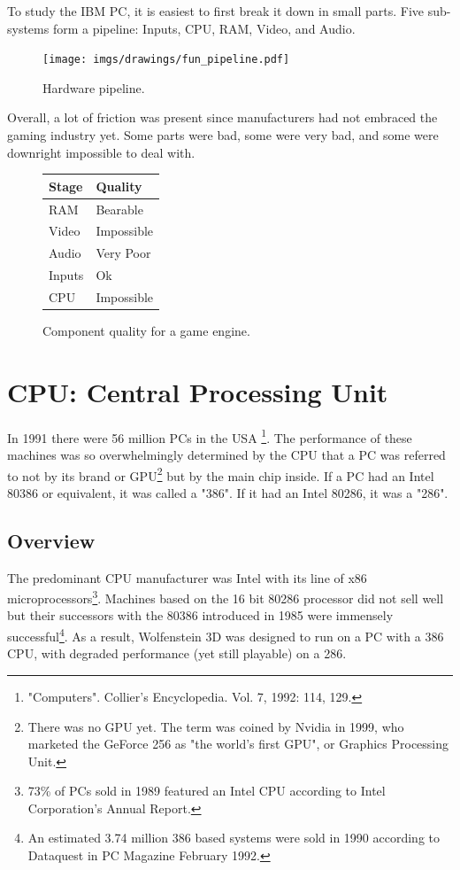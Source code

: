 \documentclass[book.tex]{subfiles}
\begin{document}
\label{chapter_hardware}
To study the IBM PC, it is easiest to first break it down in small parts. Five sub-systems form a pipeline: Inputs, CPU, RAM, Video, and Audio.\\
\begin{figure}[H]
\centering
\texttt{[image: imgs/drawings/fun\_pipeline.pdf]}
\caption{Hardware pipeline.}
\label{fig:digraph}
\end{figure}

Overall, a lot of friction was present since manufacturers had not embraced the gaming industry yet. Some parts were bad, some were very bad, and some were downright impossible to deal with.\\
\par

\begin{figure}[H]
\centering
\begin{tabularx}{\textwidth}{ X X  }
  \toprule
  \textbf{Stage} & \textbf{Quality} \\ \bottomrule
  RAM & Bearable \\ 
  Video & Impossible \\ 
  Audio & Very Poor \\ 
  Inputs & Ok \\ 
  CPU & Impossible \\ \bottomrule
\end{tabularx}
\caption{Component quality for a game engine.}
\end{figure}



\section{CPU: Central Processing Unit}
  
  In 1991 there were 56 million PCs in the USA \footnote{"Computers". Collier's Encyclopedia. Vol. 7, 1992: 114, 129.}. The performance of these machines was so overwhelmingly determined by the CPU that a PC was referred to not by its brand or GPU\footnote{There was no GPU yet. The term was coined by Nvidia in 1999, who marketed the GeForce 256 as "the world's first GPU", or Graphics Processing Unit.} but by the main chip inside. If a PC had an Intel 80386 or equivalent, it was called a "386". If it had an Intel 80286, it was a "286".\\
\subsection{Overview}
  The predominant CPU manufacturer was Intel with its line of x86 microprocessors\footnote{73\% of PCs sold in 1989 featured an Intel CPU according to Intel Corporation's Annual Report.}. Machines based on the 16 bit 80286 processor did not sell well but their successors with the 80386 introduced in 1985 were immensely successful\footnote{An estimated 3.74 million 386 based systems were sold in 1990 according to Dataquest in PC Magazine February 1992.}. As a result, Wolfenstein 3D was designed to run on a PC with a 386 CPU, with degraded performance (yet still playable) on a 286.\\
\par
\end{document}
